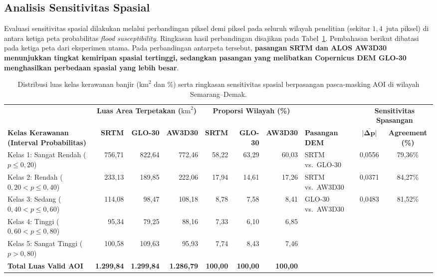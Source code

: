 \documentclass[12pt]{article}
\begin{document}
\subsection{Analisis Sensitivitas Spasial}

Evaluasi sensitivitas spasial dilakukan melalui perbandingan piksel demi
piksel pada seluruh wilayah penelitian (sekitar $1{,}4$~juta piksel) di
antara ketiga peta probabilitas \textit{flood susceptibility}. Ringkasan hasil
perbandingan disajikan pada Tabel~\ref{tab:sensitivitas}. Pembahasan
berikut dibatasi pada ketiga peta dari eksperimen utama. Pada perbandingan
antarpeta tersebut, \textbf{pasangan SRTM
dan ALOS AW3D30 menunjukkan
tingkat kemiripan spasial tertinggi, sedangkan pasangan yang melibatkan
Copernicus DEM GLO-30 menghasilkan perbedaan spasial yang lebih besar}.

\begin{table}[ht]
\small
\centering
\caption{Distribusi luas kelas kerawanan banjir ($\text{km}^2$ dan \%) serta ringkasan sensitivitas spasial berpasangan pasca-masking AOI di wilayah Semarang--Demak.}
\label{tab:sensitivitas}
\begin{adjustbox}{max width=\textwidth}
\begin{tabular}{l rrr rrr l cc}
\toprule
& \multicolumn{3}{c}{\textbf{Luas Area Terpetakan ($\text{km}^2$)}} & \multicolumn{3}{c}{\textbf{Proporsi Wilayah (\%)}} & & \multicolumn{2}{c}{\textbf{Sensitivitas Spasangan}} \\
\cmidrule(lr){2-4} \cmidrule(lr){5-7} \cmidrule(lr){9-10}
\textbf{Kelas Kerawanan (Interval Probabilitas)} & \textbf{SRTM} & \textbf{GLO-30} & \textbf{AW3D30} & \textbf{SRTM} & \textbf{GLO-30} & \textbf{AW3D30} & \textbf{Pasangan DEM} & $\boldsymbol{\overline{|\Delta p|}}$ & \textbf{Agreement (\%)} \\
\midrule
Kelas 1: Sangat Rendah ($p \le 0{,}20$) & 756,71 & 822,64 & 772,46 & 58,22 & 63,29 & 60,03 & SRTM vs.\ GLO-30 & 0,0556 & 79,36\% \\
Kelas 2: Rendah ($0{,}20 < p \le 0{,}40$) & 233,13 & 189,85 & 222,06 & 17,94 & 14,61 & 17,26 & SRTM vs.\ AW3D30 & 0,0371 & 84,27\% \\
Kelas 3: Sedang ($0{,}40 < p \le 0{,}60$) & 114,08 & 98,47 & 108,18 & 8,78 & 7,58 & 8,41 & GLO-30 vs.\ AW3D30 & 0,0483 & 81,52\% \\
Kelas 4: Tinggi ($0{,}60 < p \le 0{,}80$) & 95,34 & 79,25 & 88,16 & 7,33 & 6,10 & 6,85 & & & \\
Kelas 5: Sangat Tinggi ($p > 0{,}80$) & 100,58 & 109,63 & 95,93 & 7,74 & 8,43 & 7,46 & & & \\
\midrule
\textbf{Total Luas Valid AOI} & \textbf{1.299,84} & \textbf{1.299,84} & \textbf{1.286,79} & \textbf{100,00} & \textbf{100,00} & \textbf{100,00} & & & \\
\bottomrule
\end{tabular}
\end{adjustbox}
\end{table}
\end{document}
